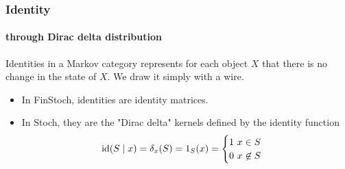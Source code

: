 \begin{frame}
    \frametitle{Identity}
    \framesubtitle{through Dirac delta distribution}
    Identities in a Markov category represents for each object $X$ that there is no change in the state of $X$. We draw it simply with a wire.\pause
    \begin{itemize}
        \item In FinStoch, identities are identity matrices. 
        \item In Stoch, they are the "Dirac delta" kernels defined by the identity function
        \[
            \text{\normalfont id} (S\mid x) = \delta_x (S) = 1_S(x) = \begin{cases} 1\ x\in S\\ 0\ x\not \in S
            \end{cases}
        \]
\end{itemize}
\end{frame}

